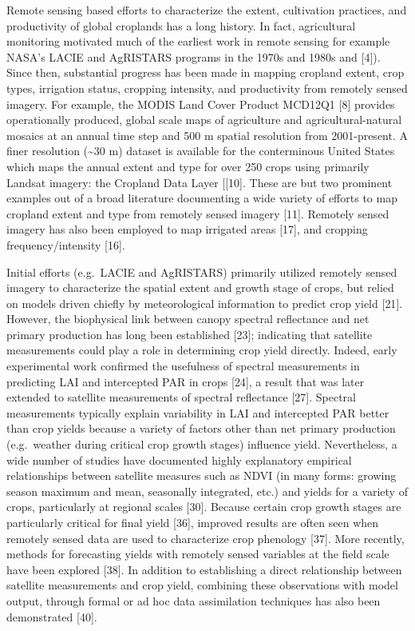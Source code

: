 \documentclass[]{elsarticle} %
\begin{document}
Remote sensing based efforts to characterize the extent, cultivation
practices, and productivity of global croplands has a long history. In
fact, agricultural monitoring motivated much of the earliest work in
remote sensing for example NASA's LACIE and AgRISTARS programs in the
1970s and 1980s and {[}4{]}). Since then, substantial progress has been
made in mapping cropland extent, crop types, irrigation status, cropping
intensity, and productivity from remotely sensed imagery. For example,
the MODIS Land Cover Product MCD12Q1 {[}8{]} provides operationally
produced, global scale maps of agriculture and agricultural-natural
mosaics at an annual time step and 500 m spatial resolution from
2001-present. A finer resolution (\textasciitilde{}30 m) dataset is
available for the conterminous United States which maps the annual
extent and type for over 250 crops using primarily Landsat imagery: the
Cropland Data Layer {[}{[}10{]}. These are but two prominent examples
out of a broad literature documenting a wide variety of efforts to map
cropland extent and type from remotely sensed imagery {[}11{]}. Remotely
sensed imagery has also been employed to map irrigated areas {[}17{]},
and cropping frequency/intensity {[}16{]}.

Initial efforts (e.g.~LACIE and AgRISTARS) primarily utilized remotely
sensed imagery to characterize the spatial extent and growth stage of
crops, but relied on models driven chiefly by meteorological information
to predict crop yield {[}21{]}. However, the biophysical link between
canopy spectral reflectance and net primary production has long been
established {[}23{]}; indicating that satellite measurements could play
a role in determining crop yield directly. Indeed, early experimental
work confirmed the usefulness of spectral measurements in predicting LAI
and intercepted PAR in crops {[}24{]}, a result that was later extended
to satellite measurements of spectral reflectance {[}27{]}. Spectral
measurements typically explain variability in LAI and intercepted PAR
better than crop yields because a variety of factors other than net
primary production (e.g.~weather during critical crop growth stages)
influence yield. Nevertheless, a wide number of studies have documented
highly explanatory empirical relationships between satellite measures
such as NDVI (in many forms: growing season maximum and mean, seasonally
integrated, etc.) and yields for a variety of crops, particularly at
regional scales {[}30{]}. Because certain crop growth stages are
particularly critical for final yield {[}36{]}, improved results are
often seen when remotely sensed data are used to characterize crop
phenology {[}37{]}. More recently, methods for forecasting yields with
remotely sensed variables at the field scale have been explored
{[}38{]}. In addition to establishing a direct relationship between
satellite measurements and crop yield, combining these observations with
model output, through formal or ad hoc data assimilation techniques has
also been demonstrated {[}40{]}.
\end{document}
